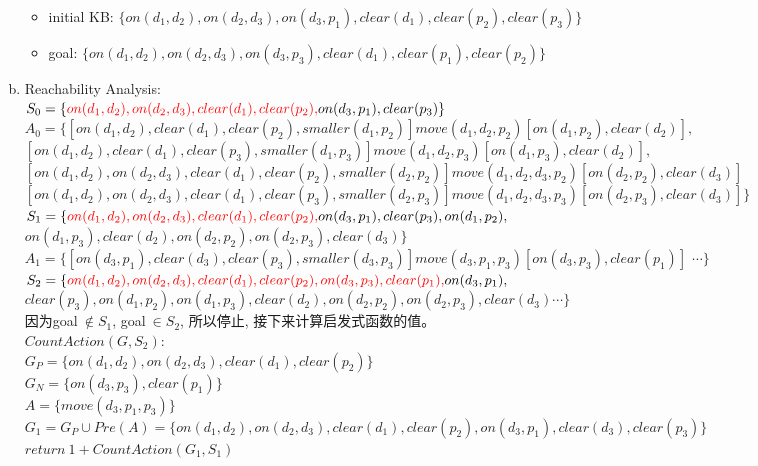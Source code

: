 \documentclass[a4paper, 11pt]{article}
\begin{document}
\begin{enumerate}[(a)]
\begin{itemize}
    \item initial KB:
    $\{ on(d_{1}, d_{2}), on(d_{2}, d_{3}), on(d_{3}, p_{1}), clear(d_{1}), clear(p_{2}), clear(p_{3}) \}$
    \item goal:
    $\{ on(d_{1}, d_{2}), on(d_{2}, d_{3}), on(d_{3}, p_{3}), clear(d_{1}), clear(p_{1}), clear(p_{2}) \}$
  \end{itemize}
  \item
  Reachability Analysis:\\
  $S_{0} = \{ \textcolor{red}{on(d_{1}, d_{2}), on(d_{2}, d_{3}), clear(d_{1}), clear(p_{2}), } on(d_{3}, p_{1}), clear(p_{3})\}$\\
  $A_{0} = \{ [on(d_{1}, d_{2}), clear(d_{1}), clear(p_{2}), smaller(d_{1}, p_{2})]move(d_{1},d_{2},p_{2})[on(d_{1}, p_{2}), clear(d_{2})],$\\
       $[on(d_{1}, d_{2}), clear(d_{1}), clear(p_{3}), smaller(d_{1}, p_{3})]move(d_{1},d_{2},p_{3})[on(d_{1}, p_{3}), clear(d_{2})],$\\
       $[on(d_{1}, d_{2}), on(d_{2}, d_{3}), clear(d_{1}), clear(p_{2}), smaller(d_{2},p_{2})]move(d_{1},d_{2},d_{3},p_{2})[on(d_{2}, p_{2}), clear(d_{3})]$\\
       $[on(d_{1}, d_{2}), on(d_{2}, d_{3}), clear(d_{1}), clear(p_{3}), smaller(d_{2},p_{3})]move(d_{1},d_{2},d_{3},p_{3})[on(d_{2}, p_{3}), clear(d_{3})]\}$\\
  $S_{1} = \{ \textcolor{red}{on(d_{1}, d_{2}), on(d_{2}, d_{3}), clear(d_{1}), clear(p_{2}), } on(d_{3}, p_{1}), clear(p_{3}),on(d_{1}, p_{2}), $\\
              $on(d_{1}, p_{3}), clear(d_{2}), on(d_{2}, p_{2}), on(d_{2}, p_{3}), clear(d_{3})\}$\\
  $A_{1} = \{ [on(d_{3},p_{1}), clear(d_{3}), clear(p_{3}), smaller(d_{3}, p_{3})]move(d_{3},p_{1},p_{3})[on(d_{3}, p_{3}), clear(p_{1})]$
            $ \cdots \}$\\
  $S_{2} = \{ \textcolor{red}{on(d_{1}, d_{2}), on(d_{2}, d_{3}), clear(d_{1}), clear(p_{2}), on(d_{3},p_{3}), clear(p_{1}), } on(d_{3}, p_{1}), $ \\
              $clear(p_{3}),on(d_{1}, p_{2}), on(d_{1}, p_{3}), clear(d_{2}), on(d_{2}, p_{2}), on(d_{2}, p_{3}), clear(d_{3}) \cdots\}$
  \\因为goal$\ \notin S_{1}$, goal$\ \in S_{2}$, 所以停止, 接下来计算启发式函数的值。\\
$CountAction(G,S_{2}):$\\
$G_{P} = \{ on(d_{1},d_{2}),on(d_{2},d_{3}),clear(d_{1}),clear(p_{2})\}$\\
$G_{N} = \{ on(d_{3},p_{3}),clear(p_{1})\}$\\
$A = \{ move(d_{3},p_{1},p_{3})\}$\\
$G_{1} = G_{P} \cup Pre(A) = \{ on(d_{1},d_{2}),on(d_{2},d_{3}),clear(d_{1}),clear(p_{2}), on(d_{3},p_{1}), clear(d_{3}), clear(p_{3})\}$\\
$return\ 1 + CountAction(G_{1},S_{1})$\\


\end{enumerate}
\end{document}
